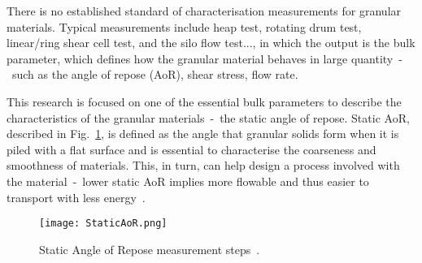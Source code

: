 There is no established standard of characterisation measurements for granular materials. Typical measurements include heap test, rotating drum test, linear/ring shear cell test, and the silo flow test..., in which the output is the bulk parameter, which defines how the granular material behaves in large quantity~-~such as the angle of repose (AoR), shear stress, flow rate. 

This research is focused on one of the essential bulk parameters to describe the characteristics of the granular materials~-~the static angle of repose. Static AoR, described in Fig.~\ref{fig:StaticAoR}, is defined as the angle that granular solids form when it is piled with a flat surface and is essential to characterise the coarseness and smoothness of materials. This, in turn, can help design a process involved with the material~-~lower static AoR implies more flowable and thus easier to transport with less energy~\cite{TEFERRA201945}.


\begin{figure}[H]
    \centering
    \texttt{[image: StaticAoR.png]}
    \caption{Static Angle of Repose measurement steps~\cite{Rackl:2018te}.}\label{fig:StaticAoR}
\end{figure}


